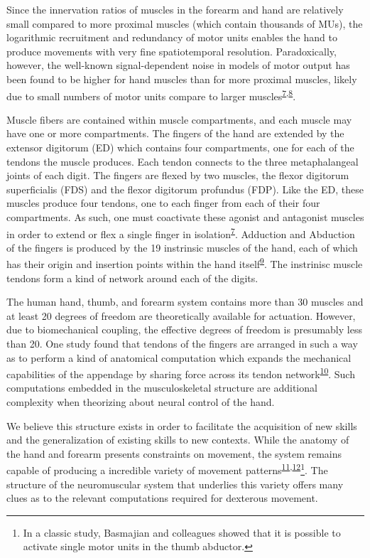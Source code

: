 \documentclass[
  a4paper,
]{article}
\begin{document}
Since the innervation ratios of muscles in the forearm and hand are
relatively small compared to more proximal muscles (which contain
thousands of MUs), the logarithmic recruitment and redundancy of motor
units enables the hand to produce movements with very fine
spatiotemporal resolution. Paradoxically, however, the well-known
signal-dependent noise in models of motor output has been found to be
higher for hand muscles than for more proximal muscles, likely due to
small numbers of motor units compare to larger
muscles\textsuperscript{\protect\hyperlink{ref-fuglevandMechanicalPropertiesNeural2011}{7},\protect\hyperlink{ref-harrisSignaldependentNoiseDetermines1998}{8}}.

Muscle fibers are contained within muscle compartments, and each muscle
may have one or more compartments. The fingers of the hand are extended
by the extensor digitorum (ED) which contains four compartments, one for
each of the tendons the muscle produces. Each tendon connects to the
three metaphalangeal joints of each digit. The fingers are flexed by two
muscles, the flexor digitorum superficialis (FDS) and the flexor
digitorum profundus (FDP). Like the ED, these muscles produce four
tendons, one to each finger from each of their four compartments. As
such, one must coactivate these agonist and antagonist muscles in order
to extend or flex a single finger in
isolation\textsuperscript{\protect\hyperlink{ref-fuglevandMechanicalPropertiesNeural2011}{7}}.
Adduction and Abduction of the fingers is produced by the 19 instrinsic
muscles of the hand, each of which has their origin and insertion points
within the hand
itself\textsuperscript{\protect\hyperlink{ref-vanduinenConstraintsControlHuman2011}{9}}.
The instrinisc muscle tendons form a kind of network around each of the
digits.

The human hand, thumb, and forearm system contains more than 30 muscles
and at least 20 degrees of freedom are theoretically available for
actuation. However, due to biomechanical coupling, the effective degrees
of freedom is presumably less than 20. One study found that tendons of
the fingers are arranged in such a way as to perform a kind of
anatomical computation which expands the mechanical capabilities of the
appendage by sharing force across its tendon
network\textsuperscript{\protect\hyperlink{ref-Valero-Cuevas2007}{10}}.
Such computations embedded in the musculoskeletal structure are
additional complexity when theorizing about neural control of the hand.

We believe this structure exists in order to facilitate the acquisition
of new skills and the generalization of existing skills to new contexts.
While the anatomy of the hand and forearm presents constraints on
movement, the system remains capable of producing a incredible variety
of movement
patterns\textsuperscript{\protect\hyperlink{ref-yanUnexpectedComplexityEveryday2020}{11},\protect\hyperlink{ref-Basmajian1963}{12}}\footnote{In
  a classic study, Basmajian and colleagues showed that it is possible
  to activate single motor units in the thumb abductor.}. The structure
of the neuromuscular system that underlies this variety offers many
clues as to the relevant computations required for dexterous movement.
\end{document}
